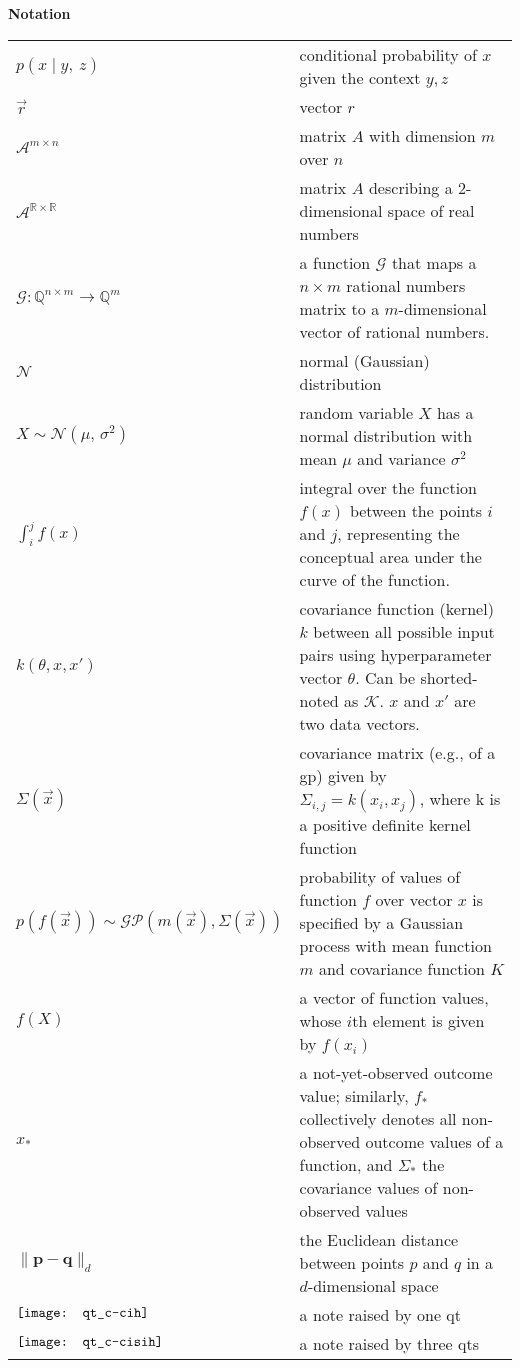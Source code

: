 \newpage
{\Large \textbf{Notation}}\\[.3cm]
\begin{tabularx}{\linewidth}{l@{\quad}X}
	$p(x \mid y,\ z)$ & conditional probability of $x$ given the context ${y, z}$\\
	$\vec{r}$ & vector $r$ \\
	$\mathcal{A}^{m \times n}$ & matrix $A$ with dimension $m$ over $n$ \\
	$\mathcal{A}^{\mathbb{R} \times \mathbb{R}}$ & matrix $A$ describing a 2-dimensional space of real numbers \\
	$\mathcal{G}: \mathbb{Q}^{n \times m} \longrightarrow \mathbb{Q}^{m}$ & a function $\mathcal{G}$ that maps a $n \times m$ rational numbers matrix to a $m$-dimensional vector of rational numbers.\\
	$\mathcal{N}$ 	&	normal (Gaussian) distribution \\
	$X \sim \mathcal{N}(\mu,\,\sigma^{2})$	&	random variable $X$ has a normal distribution with mean $\mu$ and variance $\sigma^{2}$ \\
	$\int_{i}^{j}f(x)$ & integral over the function $f(x)$ between the points $i$ and $j$, representing the conceptual area under the curve of the function.\\
	$k\left( \theta, x, x' \right)$ & covariance function (kernel) $k$ between all possible input pairs using hyperparameter vector $\theta$. Can be shorted-noted as $\mathcal{K}$. $x$ and $x'$ are two data vectors. \\
	$\Sigma(\vec{x})$	&	covariance matrix (e.g., of a \acl{gp}) given by $\Sigma_{i,j} = k(x_i, x_j)$, where k is a positive definite kernel function \\
	$p\left( f \left( \vec{x} \right) \right) \sim \mathcal{GP}\left( m(\vec{x}), \Sigma(\vec{x}) \right)$	&	probability of values of function $f$ over vector $x$ is specified by a Gaussian process with mean function $m$ and covariance function $K$ \\
	$f(X)$	&	a vector of function values, whose $i$th element is given by $f(x_i)$ \\
	$x_*$	&	a not-yet-observed outcome value; similarly, $f_*$ collectively denotes all non-observed outcome values of a function, and $\Sigma_*$ the covariance values of non-observed values \\
	$\lVert \mathbf{p - q} \rVert_d$ & the Euclidean distance between points $p$ and $q$ in a $d$-dimensional space\\
	$\vcenter{\hbox{\texttt{[image: qt\_c-cih]}}}$	& a note raised by one \acl{qt}\\
	$\vcenter{\hbox{\texttt{[image: qt\_c-cisih]}}}$	& a note raised by three \aclp{qt}\\
\end{tabularx}

